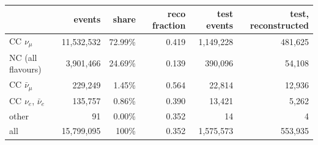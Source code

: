 \begin{tabular}{lrrrrr}
\toprule
 & events & share & reco fraction & test events & test, reconstructed \\
\midrule
CC $\nu_\mu$ & 11,532,532 & 72.99\% & 0.419 & 1,149,228 & 481,625 \\
NC (all flavours) & 3,901,466 & 24.69\% & 0.139 & 390,096 & 54,108 \\
CC $\bar\nu_\mu$ & 229,249 & 1.45\% & 0.564 & 22,814 & 12,936 \\
CC $\nu_e$, $\bar\nu_e$ & 135,757 & 0.86\% & 0.390 & 13,421 & 5,262 \\
other & 91 & 0.00\% & 0.352 & 14 & 4 \\
\midrule
all & 15,799,095 & 100\% & 0.352 & 1,575,573 & 553,935 \\
\bottomrule
\end{tabular}

